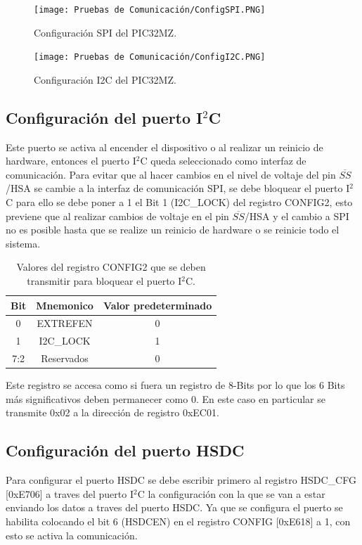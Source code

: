 \documentclass[letterpaper,12pt,oneside]{book}
\begin{document}
			\begin{figure}[!htpb]
				\centering
				\texttt{[image: Pruebas de Comunicación/ConfigSPI.PNG]}
				\caption[Configuración SPI del PIC32MZ]{Configuración SPI del PIC32MZ.}
				\label{ConfigSPI} 
				\hfill \break
				\texttt{[image: Pruebas de Comunicación/ConfigI2C.PNG]}
				\caption[Configuración I2C del PIC32MZ]{Configuración I2C del PIC32MZ.}
				\label{ConfigI2C}
			\end{figure}
			\subsection{Configuración del puerto I$^2$C}
			Este puerto se activa al encender el dispositivo o al realizar un reinicio de hardware, entonces el puerto I$^2$C queda seleccionado como interfaz de comunicación. Para evitar que al hacer cambios en el nivel de voltaje del pin $\overline{SS}$/HSA se cambie a la interfaz de comunicación SPI, se debe bloquear el puerto I$^2$C para ello se debe poner a 1 el Bit 1 (I2C\_LOCK) del registro CONFIG2, esto previene que al realizar cambios de voltaje en el pin $\overline{SS}$/HSA y el cambio a SPI no es posible hasta que se realize un reinicio de hardware o se reinicie todo el sistema.

			\begin{table}[ht]
				\centering
				\begin{tabular}{c | c | c}
					\textbf{Bit} & \textbf{Mnemonico} & \textbf{Valor predeterminado} \\
					\hline
					0 & EXTREFEN & 0 \\
					\hline
					1 & I2C\_LOCK & 1 \\
					\hline
					7:2 & Reservados & 0 \\
				\end{tabular}
				\caption[Valores de bloqueo del puerto I$^2$C]{Valores del registro CONFIG2 que se deben transmitir para bloquear el puerto I$^2$C.}
			\end{table}

			Este registro se accesa como si fuera un registro de 8-Bits por lo que los 6 Bits más significativos deben permanecer como 0. En este caso en particular se transmite 0x02 a la dirección de registro 0xEC01.
			\subsection{Configuración del puerto HSDC}
			Para configurar el puerto HSDC se debe escribir primero al registro HSDC\_CFG [0xE706] a traves del puerto I$^2$C la configuración con la que se van a estar enviando los datos a traves del puerto HSDC. Ya que se configura el puerto se habilita colocando el bit 6 (HSDCEN) en el registro CONFIG [0xE618] a 1, con esto se activa la comunicación.
\end{document}
